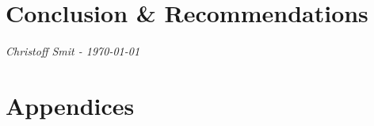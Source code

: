 \documentclass[a4paper,12pt]{article}
\numberwithin{equation}{section}
\numberwithin{figure}{section}
\numberwithin{table}{section}
\begin{document}
\newpage
\section{Conclusion \& Recommendations}


\textit{Christoff Smit - \today}




\clearpage
\newpage
{}
\printbibliography



\clearpage
\newpage
\section*{Appendices}
% 
\end{document}
